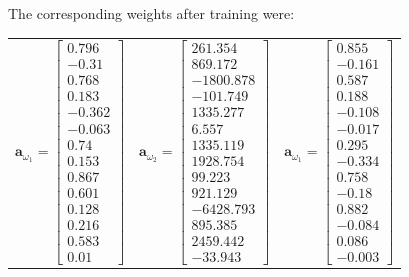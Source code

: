 \documentclass{article}
\newcommand{\mbf}[1]{\ensuremath{\mathbf{#1}}}
\begin{document}
The corresponding weights after training were:
\begin{center}
\begin{tabular}{ ccc }
$\mbf{a}_{\omega_1} = \left[\begin{matrix}
0.796\\-0.31 \\ 0.768 \\ 0.183 \\ -0.362 \\ -0.063 \\  0.74 \\ 0.153 \\ 0.867 \\  0.601 \\ 0.128 \\ 0.216 \\ 0.583 \\ 0.01
\end{matrix}\right]$ &
$\mbf{a}_{\omega_2} = \left[\begin{matrix}
261.354 \\ 869.172 \\ -1800.878 \\ -101.749 \\ 1335.277\\6.557\\1335.119\\1928.754\\99.223\\921.129\\-6428.793\\895.385\\2459.442\\-33.943
\end{matrix}\right]$ &
$\mbf{a}_{\omega_1} = \left[\begin{matrix}
0.855\\-0.161\\0.587\\0.188\\-0.108\\-0.017\\0.295\\-0.334\\0.758\\-0.18\\0.882\\-0.084\\0.086\\-0.003
\end{matrix}\right]$
\end{tabular}
\end{center}
\end{document}
